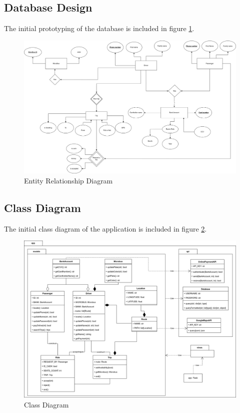 \documentclass{BusMateSRS}
\begin{document}
\subsection{Database Design}

The initial prototyping of the database is included in figure
\ref{fig:entity-relationship-diagram}.

\begin{figure}[h!]
	\begin{center}
		\includegraphics[width=\columnwidth]{drawings/entity-relationship-diagram.drawio.png}
	\end{center}
	\caption{Entity Relationship Diagram}
	\label{fig:entity-relationship-diagram}
\end{figure}

\subsection{Class Diagram}
The initial class diagram of the application is included in figure
\ref{fig:class-diagram}.

\begin{figure}[h!]
	\begin{center}
		\includegraphics[width=\columnwidth]{drawings/class-diagram.drawio.png}
	\end{center}
	\caption{Class Diagram}
	\label{fig:class-diagram}
\end{figure}
\end{document}

